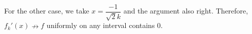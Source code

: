 \documentclass[12pt]{article}
\begin{document}
\begin{enumerate}
\begin{enumerate}
        For the other case, we take $x = \dfrac{-1}{\sqrt{2}k}$ and the argument also right.
        Therefore, $f_k'(x) \nrightarrow f$ uniformly on any interval contains $0$.
    \end{enumerate}
\end{enumerate}
\end{document}
